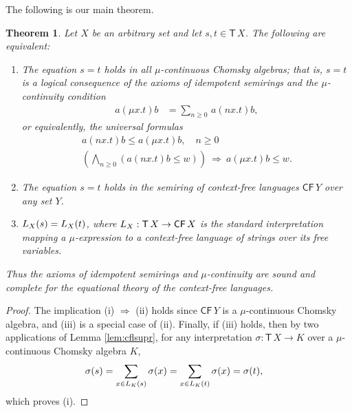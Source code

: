 \documentclass[copyright,creativecommons]{eptcs}
\newtheorem{theorem}{Theorem}[section]
\theoremstyle{remark}
\newcommand\fun{\mathrel\rightarrow}
\newcommand\Imp{\mathrel\Rightarrow}
\newcommand\mathname[1]{\ensuremath{\mathsf{#1}}}
\newcommand\CFname{\mathname{CF}}
\newcommand\CF[1]{\CFname\,#1}
\newcommand\Tname{\mathname{T}}
\newcommand\T[1]{\Tname\,#1}
\newcommand{\fhcomment}[1]{\textcolor{red}{[\textbf{Comment (FH)}: {#1}]}}
\newcommand{\dkcomment}[1]{\textcolor{blue}{[\textbf{Comment (DK)}: {#1}]}}
\renewcommand{\fhcomment}[1]{}
\renewcommand{\dkcomment}[1]{}
\begin{document}
The following is our main theorem.
\begin{theorem}
Let $X$ be an arbitrary set and let $s,t\in\T X$. 
\fhcomment{Question: Which $X$? Arbitrary set?}\dkcomment{Yes.}The following are equivalent:
\begin{enumerate}
\renewcommand\labelenumi{{\upshape(\roman{enumi})}}
\item
The equation $s=t$ holds in all $\mu$-continuous Chomsky algebras; that is, $s=t$ is a logical consequence of the axioms of idempotent semirings and the $\mu$-continuity condition
\begin{align}
a(\mu x.t)b &= \sum_{n\geq 0}\,a(nx.t)b,\label{ax:mucontA}
\end{align}
or equivalently, the universal formulas
\begin{gather}
a(nx.t)b \leq a(\mu x.t)b,\quad n\geq 0\label{ax:mucont1A}\\
\left(\bigwedge_{n\geq 0} (a(nx.t)b \leq w)\right)\ \Imp\ a(\mu x.t)b \leq w.\label{ax:mucont2A}
\end{gather}
\item
The equation $s=t$ holds in the semiring of context-free languages $\CF Y$ over any set $Y$.
\item
$L_{X}(s)=L_{X}(t)$, where $\canon X:\T X\fun\CF X$ is the standard interpretation mapping a $\mu$-expression to a context-free language of strings over its free variables.
\end{enumerate}
Thus the axioms of idempotent semirings and $\mu$-continuity are sound and complete for the equational theory of the context-free languages.
\end{theorem}
\begin{proof}
The implication (i) $\Imp$ (ii) holds since $\CF Y$ is a $\mu$-continuous Chomsky algebra, and (iii) is a special case of (ii). Finally, if (iii) holds, then by two applications of Lemma \ref{lem:cflsupr}, for any interpretation $\sigma:\T X\fun K$ over a $\mu$-continuous Chomsky algebra $K$,
\begin{align*}
\sigma(s) &= \sum_{x\in L_{K}(s)} \sigma(x) = \sum_{x\in L_{K}(t)} \sigma(x) = \sigma(t),
\end{align*}
which proves (i).
\end{proof}
\end{document}
